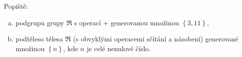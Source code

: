 \subsubsection{}
Popiště:
\begin{enumerate}[a)]
  \item podgrupu grupy $\Re$ s operací $+$ generovanou množinou $\left \{ 3,11
  \right \}$,
  \item podtěleso tělesa $\Re$ (s obvyklými operacemi sčítání a násobení)
  generované množinou $\left \{ n \right \}$, kde $n$ je celé nenulové číslo.
\end{enumerate}

